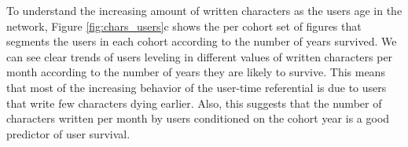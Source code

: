 To understand the increasing amount of written characters as the users age in the network, Figure \ref{fig:chars_users}c shows the per cohort set of figures that segments the users in each cohort according to the number of years survived. We can see clear trends of users leveling in different values of written characters per month according to the number of years they are likely to survive. This means that most of the increasing behavior of the user-time referential is due to users that write few characters dying earlier. Also, this suggests that the number of characters written per month by users conditioned on the cohort year is a good predictor of user survival.

%
%
%
